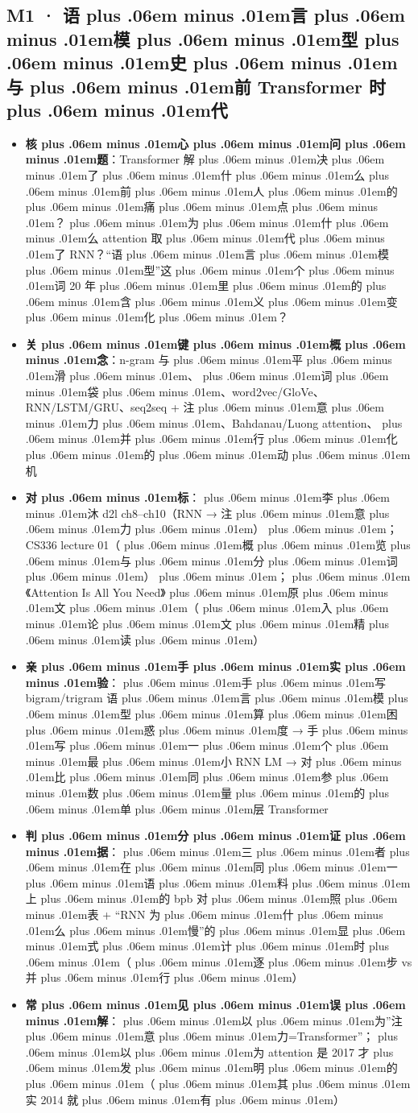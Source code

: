 \documentclass[
]{article}
\providecommand{\tightlist}{%
  \setlength{\itemsep}{0pt}\setlength{\parskip}{0pt}}
\def\zh#1{{\zhfont #1}}
\def\sym#1{{\symfont #1}}
\def\zhglue{\hskip0pt plus .06em minus .01em}
\begin{document}
\subsection{M1 \sym{·} \zh{语\zhglue 言\zhglue 模\zhglue 型\zhglue 史\zhglue 与\zhglue 前} Transformer \zh{时\zhglue 代}}\label{m1-ux8bedux8a00ux6a21ux578bux53f2ux4e0eux524d-transformer-ux65f6ux4ee3}

\begin{itemize}
\tightlist
\item
  \textbf{\zh{核\zhglue 心\zhglue 问\zhglue 题}}\zh{：}Transformer \zh{解\zhglue 决\zhglue 了\zhglue 什\zhglue 么\zhglue 前\zhglue 人\zhglue 的\zhglue 痛\zhglue 点\zhglue ？\zhglue 为\zhglue 什\zhglue 么} attention \zh{取\zhglue 代\zhglue 了} RNN\zh{？}``\zh{语\zhglue 言\zhglue 模\zhglue 型}''\zh{这\zhglue 个\zhglue 词} 20 \zh{年\zhglue 里\zhglue 的\zhglue 含\zhglue 义\zhglue 变\zhglue 化\zhglue ？}
\item
  \textbf{\zh{关\zhglue 键\zhglue 概\zhglue 念}}\zh{：}n-gram \zh{与\zhglue 平\zhglue 滑\zhglue 、\zhglue 词\zhglue 袋\zhglue 、}word2vec/GloVe\zh{、}RNN/LSTM/GRU\zh{、}seq2seq + \zh{注\zhglue 意\zhglue 力\zhglue 、}Bahdanau/Luong attention\zh{、\zhglue 并\zhglue 行\zhglue 化\zhglue 的\zhglue 动\zhglue 机}
\item
  \textbf{\zh{对\zhglue 标}}\zh{：\zhglue 李\zhglue 沐} d2l ch8--ch10\zh{（}RNN \sym{→} \zh{注\zhglue 意\zhglue 力\zhglue ）\zhglue ；}CS336 lecture 01\zh{（\zhglue 概\zhglue 览\zhglue 与\zhglue 分\zhglue 词\zhglue ）\zhglue ；\zhglue 《}Attention Is All You Need\zh{》\zhglue 原\zhglue 文\zhglue （\zhglue 入\zhglue 论\zhglue 文\zhglue 精\zhglue 读\zhglue ）}
\item
  \textbf{\zh{亲\zhglue 手\zhglue 实\zhglue 验}}\zh{：\zhglue 手\zhglue 写} bigram/trigram \zh{语\zhglue 言\zhglue 模\zhglue 型\zhglue 算\zhglue 困\zhglue 惑\zhglue 度} \sym{→} \zh{手\zhglue 写\zhglue 一\zhglue 个\zhglue 最\zhglue 小} RNN LM \sym{→} \zh{对\zhglue 比\zhglue 同\zhglue 参\zhglue 数\zhglue 量\zhglue 的\zhglue 单\zhglue 层} Transformer
\item
  \textbf{\zh{判\zhglue 分\zhglue 证\zhglue 据}}\zh{：\zhglue 三\zhglue 者\zhglue 在\zhglue 同\zhglue 一\zhglue 语\zhglue 料\zhglue 上\zhglue 的} bpb \zh{对\zhglue 照\zhglue 表} + ``RNN \zh{为\zhglue 什\zhglue 么\zhglue 慢}''\zh{的\zhglue 显\zhglue 式\zhglue 计\zhglue 时\zhglue （\zhglue 逐\zhglue 步} vs \zh{并\zhglue 行\zhglue ）}
\item
  \textbf{\zh{常\zhglue 见\zhglue 误\zhglue 解}}\zh{：\zhglue 以\zhglue 为}''\zh{注\zhglue 意\zhglue 力}=Transformer''\zh{；\zhglue 以\zhglue 为} attention \zh{是} 2017 \zh{才\zhglue 发\zhglue 明\zhglue 的\zhglue （\zhglue 其\zhglue 实} 2014 \zh{就\zhglue 有\zhglue ）}
\end{itemize}
\end{document}
